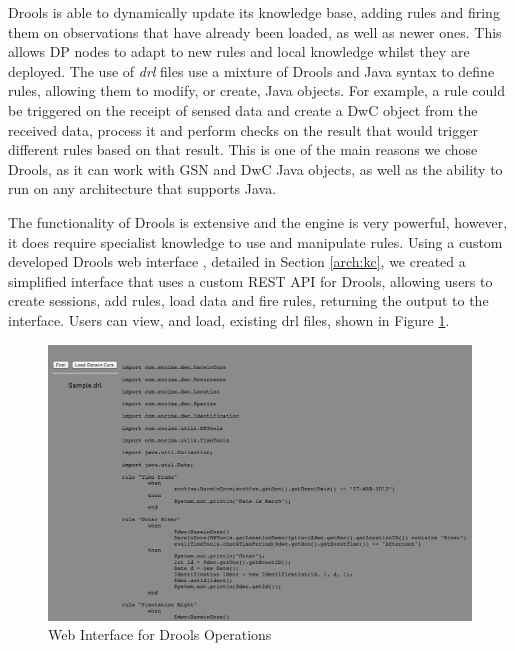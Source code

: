 	Drools is able to dynamically update its knowledge base, adding rules and firing them on observations that have already been loaded, as well as newer ones. This allows DP nodes to adapt to new rules and local knowledge whilst they are deployed. The use of \textit{drl} files use a mixture of Drools and Java syntax to define rules, allowing them to modify, or create, Java objects. For example, a rule could be triggered on the receipt of sensed data and create a DwC object from the received data, process it and perform checks on the result that would trigger different rules based on that result. This is one of the main reasons we chose Drools, as it can work with GSN and DwC Java objects, as well as the ability to run on any architecture that supports Java. \DIFaddbegin {}\DIFaddend 

	The functionality of Drools is extensive and the engine is very powerful, however, it does require specialist knowledge to use and manipulate rules. Using a custom developed Drools web interface , detailed in Section \ref{arch:kc}, we created a simplified interface that uses a custom REST API for Drools, allowing users to create sessions, add rules, load data and fire rules, returning the output to the interface. Users can view, and load, existing drl files, shown in Figure \ref{kc:loris_drl}. \DIFaddbegin {}\DIFaddend 

		\begin{figure}[h]
		\centering
		\includegraphics[width=\textwidth]{Chap4/figures/rules}
		\caption{Web Interface for Drools Operations}
		\label{kc:loris_drl}
		\end{figure}

